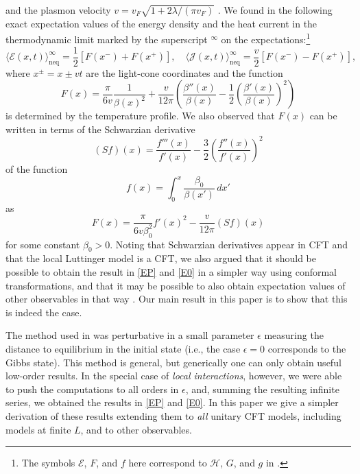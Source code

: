 \documentclass[12pt,a4paper]{article}
\newcommand{\cE}{\mathcal{E}}
\newcommand{\cH}{\mathcal{H}}
\newcommand{\cJ}{\mathcal{J}}
\theoremstyle{definition}
\theoremstyle{remark}
\begin{document}
\vskip -0.5cm
\noindent and the plasmon velocity $v = v_F \sqrt{1+2\lambda/(\pi v_F)}$ \cite{LLMM1,Voit}.
We found in \cite{LLMM2} the following exact expectation values of the
energy density and the heat current in the thermodynamic limit marked by
the superscript ${{}^\infty}$ on the expectations:\footnote{The symbols
$\cE$, $F$, and $f$ here correspond to $\cH$, $G$, and $g$ in \cite{LLMM2}.}
%
\begin{equation}
\label{EP}
\big\langle \cE(x,t) \big\rangle^\infty_{\text{neq}}
= \frac{1}{2} \left[ F(x^-)+F(x^+) \right],
\quad
\big\langle \cJ(x,t) \big\rangle^\infty_{\text{neq}}
= \frac{v}{2} \left[ F(x^-)-F(x^+) \right],
\end{equation} 
%
where $x^\pm = x\pm vt$ are the light-cone coordinates and the function
% 
\begin{equation}
\label{E0}
F(x)
= \frac{\pi}{6v}\frac1{\beta(x)^2} + \frac{v}{12\pi}
	\left(
		\frac{\beta''(x)}{\beta(x)}
		- \frac{1}{2} \left( \frac{\beta'(x)}{\beta(x)} \right)^2
	\right) 
\end{equation}
%
is determined by the temperature profile.
We also observed that $F(x)$ can be written in terms of the Schwarzian derivative
%
\begin{equation} 
\label{S} 
(Sf)(x) = \frac{f'''(x)}{f'(x)} - \frac{3}{2} \left( \frac{f''(x)}{f'(x)} \right)^2
\end{equation}
%
of the function 
%
\begin{equation} 
\label{f}
f(x) = \int_0^x \frac{\beta_0}{\beta(x')} \, dx'
\end{equation}
%
as
%
\begin{equation} 
\label{F1} 
F(x) = \frac{\pi}{6v \beta_0^2}f'(x)^2 - \frac{v}{12\pi}(Sf)(x)
\end{equation}
%
for some constant $\beta_0>0$. 
Noting that Schwarzian derivatives appear in CFT \cite{FMS} and that the local Luttinger model is a CFT, we also argued that it should be possible to obtain the result in \eqref{EP} and \eqref{E0} in a simpler way using conformal transformations, and that it may be possible to also obtain expectation values of other observables in that way
\cite{LLMM2}.
Our main result in this paper is to show that this is indeed the case. 
\vskip 0.1cm

The method used in \cite{LLMM2} was perturbative in a small parameter $\epsilon$ measuring the distance to equilibrium in the initial state (i.e., the case $\epsilon=0$ corresponds to the Gibbs state).
This method is general, but generically one can only obtain useful low-order results.
In the special case of {\it local interactions}, however, we were able to push the computations to all orders in $\epsilon$, and, summing the resulting infinite series, we obtained the results in \eqref{EP} and \eqref{E0}.
In this paper we give a simpler derivation of these results extending them to {\it all} unitary CFT models, including models at finite $L$, and to other observables.
\vskip 0.1cm
\end{document}
